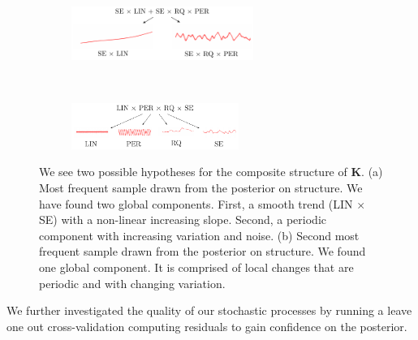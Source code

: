\begin{figure}
        \centering
        \begin{subfigure}[b]{\textwidth} \centering
                \includegraphics[width=0.65\textwidth]{figs/airline_struct_1.pdf}\caption{}
        \end{subfigure}\\
        
        \vspace*{0.75cm}
	\begin{subfigure}[b]{\textwidth} \centering
                \includegraphics[width=0.6\textwidth]{figs/airline_struct_2.pdf}\caption{}
        \end{subfigure}%
        \caption{We see two possible hypotheses for the composite structure of $\mathbf{K}$. (a) Most frequent sample drawn from the posterior on structure. We have found two global components. First, a smooth trend (LIN $\times$ SE) with a non-linear increasing slope. Second, a periodic component with increasing variation and noise. (b) Second most frequent sample drawn from the posterior on structure. We found one global component. It is comprised of local changes that are periodic and with changing variation.}\label{fig:posterior_twosamples}
\end{figure}
We further investigated the quality of our stochastic processes by running a leave one out cross-validation computing residuals to gain confidence on the posterior.
